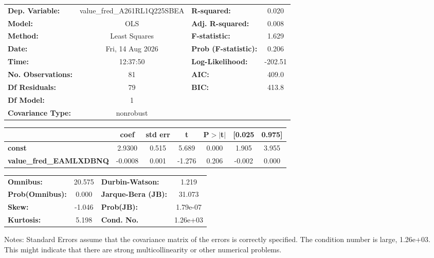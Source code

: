 \begin{center}
\begin{tabular}{lclc}
\toprule
\textbf{Dep. Variable:}         & value\_fred\_A261RL1Q225SBEA & \textbf{  R-squared:         } &     0.020   \\
\textbf{Model:}                 &             OLS              & \textbf{  Adj. R-squared:    } &     0.008   \\
\textbf{Method:}                &        Least Squares         & \textbf{  F-statistic:       } &     1.629   \\
\textbf{Date:}                  &       Fri, 14 Aug 2026       & \textbf{  Prob (F-statistic):} &    0.206    \\
\textbf{Time:}                  &           12:37:50           & \textbf{  Log-Likelihood:    } &   -202.51   \\
\textbf{No. Observations:}      &                81            & \textbf{  AIC:               } &     409.0   \\
\textbf{Df Residuals:}          &                79            & \textbf{  BIC:               } &     413.8   \\
\textbf{Df Model:}              &                 1            & \textbf{                     } &             \\
\textbf{Covariance Type:}       &          nonrobust           & \textbf{                     } &             \\
\bottomrule
\end{tabular}
\begin{tabular}{lcccccc}
                                & \textbf{coef} & \textbf{std err} & \textbf{t} & \textbf{P$> |$t$|$} & \textbf{[0.025} & \textbf{0.975]}  \\
\midrule
\textbf{const}                  &       2.9300  &        0.515     &     5.689  &         0.000        &        1.905    &        3.955     \\
\textbf{value\_fred\_EAMLXDBNQ} &      -0.0008  &        0.001     &    -1.276  &         0.206        &       -0.002    &        0.000     \\
\bottomrule
\end{tabular}
\begin{tabular}{lclc}
\textbf{Omnibus:}       & 20.575 & \textbf{  Durbin-Watson:     } &    1.219  \\
\textbf{Prob(Omnibus):} &  0.000 & \textbf{  Jarque-Bera (JB):  } &   31.073  \\
\textbf{Skew:}          & -1.046 & \textbf{  Prob(JB):          } & 1.79e-07  \\
\textbf{Kurtosis:}      &  5.198 & \textbf{  Cond. No.          } & 1.26e+03  \\
\bottomrule
\end{tabular}
\end{center}

Notes: \newline
 [1] Standard Errors assume that the covariance matrix of the errors is correctly specified. \newline
 [2] The condition number is large, 1.26e+03. This might indicate that there are \newline
 strong multicollinearity or other numerical problems.